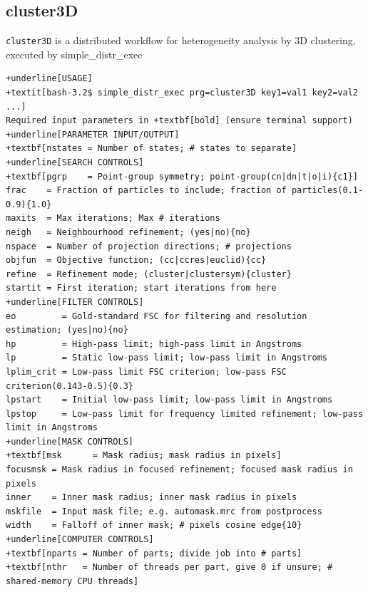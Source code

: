 \documentclass[a4paper,11pt]{article}
\newcommand{\prgname}[1]{\textcolor{NavyBlue}{\texttt{#1}}}
\begin{document}
\subsection{cluster3D}
\label{cluster3D}
\prgname{cluster3D} is a distributed workflow for heterogeneity analysis by 3D clustering, executed by simple\_distr\_exec
\begin{Verbatim}[commandchars=+\[\],fontsize=\small,breaklines=true]
+underline[USAGE]
+textit[bash-3.2$ simple_distr_exec prg=cluster3D key1=val1 key2=val2 ...]
Required input parameters in +textbf[bold] (ensure terminal support)
+underline[PARAMETER INPUT/OUTPUT]
+textbf[nstates = Number of states; # states to separate]
+underline[SEARCH CONTROLS]
+textbf[pgrp    = Point-group symmetry; point-group(cn|dn|t|o|i){c1}]
frac    = Fraction of particles to include; fraction of particles(0.1-0.9){1.0}
maxits  = Max iterations; Max # iterations
neigh   = Neighbourhood refinement; (yes|no){no}
nspace  = Number of projection directions; # projections
objfun  = Objective function; (cc|ccres|euclid){cc}
refine  = Refinement mode; (cluster|clustersym){cluster}
startit = First iteration; start iterations from here
+underline[FILTER CONTROLS]
eo         = Gold-standard FSC for filtering and resolution estimation; (yes|no){no}
hp         = High-pass limit; high-pass limit in Angstroms
lp         = Static low-pass limit; low-pass limit in Angstroms
lplim_crit = Low-pass limit FSC criterion; low-pass FSC criterion(0.143-0.5){0.3}
lpstart    = Initial low-pass limit; low-pass limit in Angstroms
lpstop     = Low-pass limit for frequency limited refinement; low-pass limit in Angstroms
+underline[MASK CONTROLS]
+textbf[msk      = Mask radius; mask radius in pixels]
focusmsk = Mask radius in focused refinement; focused mask radius in pixels
inner    = Inner mask radius; inner mask radius in pixels
mskfile  = Input mask file; e.g. automask.mrc from postprocess
width    = Falloff of inner mask; # pixels cosine edge{10}
+underline[COMPUTER CONTROLS]
+textbf[nparts = Number of parts; divide job into # parts]
+textbf[nthr   = Number of threads per part, give 0 if unsure; # shared-memory CPU threads]
\end{Verbatim}
\end{document}
